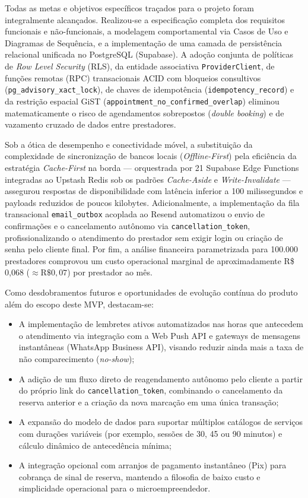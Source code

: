\documentclass[12pt,a4paper]{article}
\begin{document}
Todas as metas e objetivos específicos traçados para o projeto foram integralmente alcançados. Realizou-se a especificação completa dos requisitos funcionais e não-funcionais, a modelagem comportamental via Casos de Uso e Diagramas de Sequência, e a implementação de uma camada de persistência relacional unificada no PostgreSQL (Supabase). A adoção conjunta de políticas de \textit{Row Level Security} (RLS), da entidade associativa \texttt{ProviderClient}, de funções remotas (RPC) transacionais ACID com bloqueios consultivos (\texttt{pg\_advisory\_xact\_lock}), de chaves de idempotência (\texttt{idempotency\_record}) e da restrição espacial GiST (\texttt{appointment\_no\_confirmed\_overlap}) eliminou matematicamente o risco de agendamentos sobrepostos (\textit{double booking}) e de vazamento cruzado de dados entre prestadores.

Sob a ótica de desempenho e conectividade móvel, a substituição da complexidade de sincronização de bancos locais (\textit{Offline-First}) pela eficiência da estratégia \textit{Cache-First} na borda --- orquestrada por 21 Supabase Edge Functions integradas ao Upstash Redis sob os padrões \textit{Cache-Aside} e \textit{Write-Invalidate} --- assegurou respostas de disponibilidade com latência inferior a 100 milissegundos e payloads reduzidos de poucos kilobytes. Adicionalmente, a implementação da fila transacional \texttt{email\_outbox} acoplada ao Resend automatizou o envio de confirmações e o cancelamento autônomo via \texttt{cancellation\_token}, profissionalizando o atendimento do prestador sem exigir login ou criação de senha pelo cliente final. Por fim, a análise financeira parametrizada para 100.000 prestadores comprovou um custo operacional marginal de aproximadamente R\$ 0,068 ($\approx \text{R\$ } 0{,}07$) por prestador ao mês.

Como desdobramentos futuros e oportunidades de evolução contínua do produto além do escopo deste MVP, destacam-se:
\begin{itemize}
    \item A implementação de lembretes ativos automatizados nas horas que antecedem o atendimento via integração com a Web Push API e gateways de mensagens instantâneas (WhatsApp Business API), visando reduzir ainda mais a taxa de não comparecimento (\textit{no-show});
    \item A adição de um fluxo direto de reagendamento autônomo pelo cliente a partir do próprio link do \texttt{cancellation\_token}, combinando o cancelamento da reserva anterior e a criação da nova marcação em uma única transação;
    \item A expansão do modelo de dados para suportar múltiplos catálogos de serviços com durações variáveis (por exemplo, sessões de 30, 45 ou 90 minutos) e cálculo dinâmico de antecedência mínima;
    \item A integração opcional com arranjos de pagamento instantâneo (Pix) para cobrança de sinal de reserva, mantendo a filosofia de baixo custo e simplicidade operacional para o microempreendedor.
\end{itemize}
\end{document}
